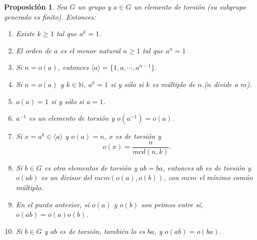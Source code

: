 \documentclass[12pt]{article}
\newtheorem{proposition}[theorem]{Proposición}
\begin{document}
\begin{proposition}\label{prop:ordenes} Sea $G$ un grupo y $a \in G$ un elemento de torsión (su subgrupo generado es finito). Entonces:
\renewcommand{\labelenumi}{\arabic{enumi}.}
\begin{enumerate}
\item Existe $k \geq 1$ tal que $a^{k}=1$.
\item El orden de $a$ es el menor natural $n \geq 1$ tal que $a^{n} = 1$
\item Si $n = o(a)$, entonces $\langle a \rangle = \lbrace 1, a, \cdots, a^{n-1} \rbrace.$
\item Si $n = o(a)$ y $k \in \mathbb{N}$, $a^{k} = 1$ si y sólo si $k$ es múltiplo de $n$.($n$ divide a $m$).
\item $o(a)=1$ si y sólo si $a=1$.
\item $a^{-1}$ es un elemento de torsión y $o(a^{-1}) = o(a)$.
\item Si $x = a^k \in \langle a \rangle$ y $o(a) = n$, $x$ es de torsión y $$o(x) = \dfrac{n}{mcd(n,k)}.$$ 
\item Si $b \in G$ es otro elementos de torsión y $ab = ba$, entonces $ab$ es de torsión y $o(ab)$ es un divisor del $mcm(o(a), o(b))$, con $mcm$ el mínimo común múltiplo.
\item En el punto anterior, si $o(a)$ y $o(b)$ son primos entre sí, $o(ab) = o(a)o(b)$.
\item Si $b \in G$ y $ab$ es de torsión, también lo es $ba$, y $o(ab) = o(ba)$.
\end{enumerate}
\end{proposition}
\end{document}
